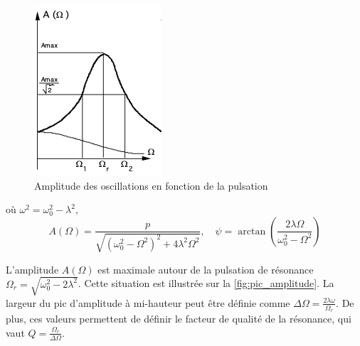 \begin{figure}
    \vspace*{-0.5cm}
    \centering
    \includegraphics[width=\linewidth]{figures/pic_amplitude.png}
    \caption{Amplitude des oscillations en fonction de la pulsation \cite{notice}}
    \label{fig:pic_amplitude}
    \vspace*{-2.5cm}
\end{figure}
où \(\omega^2 = \omega_0^2 - \lambda^2\), 
\begin{equation}
    A(\Omega) = \frac{p}{\sqrt{\left(\omega_0^2-\Omega^2\right)^2 + 4\lambda^2\Omega^2}}, \quad \psi = \arctan \left(\frac{2\lambda\Omega}{\omega_0^2-\Omega^2}\right)
    \label{eq:A_et_psi}
\end{equation}

L'amplitude \(A(\Omega)\) est maximale autour de la pulsation de résonance \(\Omega_r = \sqrt{\omega_0^2-2\lambda^2}\). Cette situation est illustrée sur la \autoref{fig:pic_amplitude}. La largeur du pic d'amplitude à mi-hauteur peut être définie comme \(\Delta \Omega = \frac{2 \lambda \omega}{\Omega_r}\). De plus, ces valeurs permettent de définir le facteur de qualité de la résonance, qui vaut \(Q = \frac{\Omega_r}{\Delta\Omega}\).

